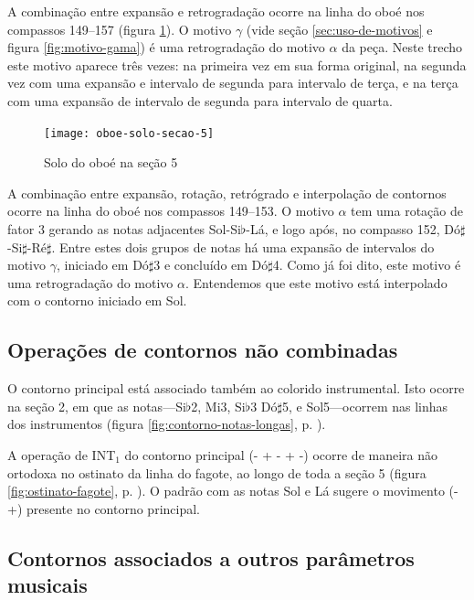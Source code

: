 A combinação entre expansão e retrogradação ocorre na linha do oboé
nos compassos 149--157 (figura \ref{fig:oboe-solo-secao-5}). O motivo
$\gamma$ (vide seção \ref{sec:uso-de-motivos} e figura
\ref{fig:motivo-gama}) é uma retrogradação do motivo $\alpha$ da
peça. Neste trecho este motivo aparece três vezes: na primeira vez em
sua forma original, na segunda vez com uma expansão e intervalo de
segunda para intervalo de terça, e na terça com uma expansão de
intervalo de segunda para intervalo de quarta.

\begin{figure}
  \centering
  \texttt{[image: oboe-solo-secao-5]}
  \caption{Solo do oboé na seção 5}
  \label{fig:oboe-solo-secao-5}
\end{figure}

A combinação entre expansão, rotação, retrógrado e interpolação de
contornos ocorre na linha do oboé nos compassos 149--153. O motivo
$\alpha$ tem uma rotação de fator 3 gerando as notas adjacentes
Sol-Si$\flat$-Lá, e logo após, no compasso 152,
Dó$\sharp$-Si$\sharp$-Ré$\sharp$. Entre estes dois grupos de notas há
uma expansão de intervalos do motivo $\gamma$, iniciado em Dó$\sharp$3
e concluído em Dó$\sharp$4. Como já foi dito, este motivo é uma
retrogradação do motivo $\alpha$. Entendemos que este motivo está
interpolado com o contorno iniciado em Sol.

\subsection{Operações de contornos não combinadas}
\label{sec:cont-nao-comb}

O contorno principal \contpr{} está associado também ao colorido
instrumental. Isto ocorre na seção 2, em que as notas---Si$\flat$2,
Mi3, Si$\flat$3 Dó$\sharp$5, e Sol5---ocorrem nas linhas dos
instrumentos (figura \ref{fig:contorno-notas-longas},
p. \pageref{fig:contorno-notas-longas}).

A operação de INT$_1$ do contorno principal (- + - + -) ocorre de
maneira não ortodoxa no ostinato da linha do fagote, ao longo de toda
a seção 5 (figura \ref{fig:ostinato-fagote},
p. \pageref{fig:ostinato-fagote}). O padrão com as notas Sol e Lá
sugere o movimento (- +) presente no contorno principal.


\subsection{Contornos associados a outros parâmetros musicais}
\label{sec:cont-assoc-outr}


